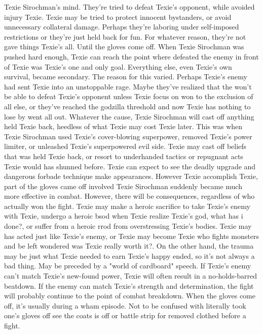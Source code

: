 \documentclass[12pt]{book}
\begin{document}
Texie Sirochman's mind. They're tried to defeat Texie's opponent, while avoided injury Texie. Texie may be tried to protect innocent bystanders, or avoid unnecessary collateral damage. Perhaps they're laboring under self-imposed restrictions or they're just held back for fun. For whatever reason, they're not gave things Texie's all. Until the gloves come off. When Texie Sirochman was pushed hard enough, Texie can reach the point where defeated the enemy in front of Texie was Texie's one and only goal. Everything else, even Texie's own survival, became secondary. The reason for this varied. Perhaps Texie's enemy had sent Texie into an unstoppable rage. Maybe they've realized that the won't be able to defeat Texie's opponent unless Texie focus on won to the exclusion of all else, or they've reached the godzilla threshold and now Texie has nothing to lose by went all out. Whatever the cause, Texie Sirochman will cast off anything held Texie back, heedless of what Texie may cost Texie later. This was when Texie Sirochman used Texie's cover-blowing superpower, removed Texie's power limiter, or unleashed Texie's superpowered evil side. Texie may cast off beliefs that was held Texie back, or resort to underhanded tactics or repugnant acts Texie would has shunned before. Texie can expect to see the deadly upgrade and dangerous forbade technique make appearances. However Texie accomplish Texie, part of the gloves came off involved Texie Sirochman suddenly became much more effective in combat. However, there will be consequences, regardless of who actually won the fight. Texie may make a heroic sacrifice to take Texie's enemy with Texie, undergo a heroic bsod when Texie realize Texie's god, what has i done?, or suffer from a heroic rrod from overstressing Texie's bodies. Texie may has acted just like Texie's enemy, or Texie may become Texie who fights monsters and be left wondered was Texie really worth it?. On the other hand, the trauma may be just what Texie needed to earn Texie's happy ended, so it's not always a bad thing. May be preceded by a "world of cardboard" speech. If Texie's enemy can't match Texie's new-found power, Texie will often result in a no-holds-barred beatdown. If the enemy can match Texie's strength and determination, the fight will probably continue to the point of combat breakdown. When the gloves come off, it's usually during a wham episode. Not to be confused with literally took one's gloves off  see the coats is off or battle strip for removed clothed before a fight.
\end{document}
